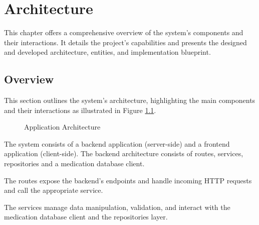 %
%
\chapter{Architecture} \label{cap:architecture}

This chapter offers a comprehensive overview of the system's components and their interactions. It details the project's capabilities and presents the designed and developed architecture, entities, and implementation blueprint.

\section{Overview}

This section outlines the system’s architecture, highlighting the main components and their interactions as illustrated in Figure \ref{fig:architecture}.

\begin{figure}[h]
	\begin{center}
	\end{center}
	\caption{Application Architecture}\label{fig:architecture}
\end{figure}


The system consists of a backend application (server-side) and a frontend application (client-side).
The backend architecture consists of routes, services, repositories and a medication database client.

The routes expose the backend's endpoints and handle incoming HTTP requests and call the appropriate service.

The services manage data manipulation, validation, and interact with the medication database client and the repositories layer.

